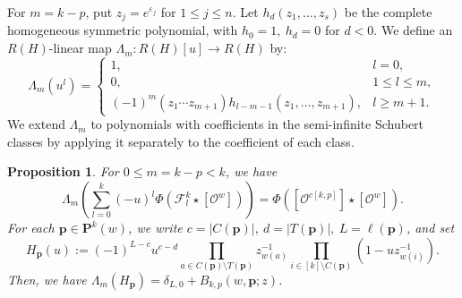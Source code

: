 \documentclass[11pt,a4paper,reqno]{amsart}
\DeclareRobustCommand{\rev}[1]{{\color{revision}#1}}
\numberwithin{equation}{section}
\newtheorem{proposition}[theorem]{Proposition}
\theoremstyle{definition}
\newcommand{\OO}{\mathcal O}
\newcommand{\Sc}[1]{[\OO^{#1}]}
\newcommand{\Pieri}{\mathbf P}
\newcommand{\pp}{\mathbf p}
\newcommand{\eps}{\varepsilon}
\newcommand{\FF}{\mathcal F}
\newcommand{\ck}{c[k,p]}
\begin{document}
For \(m=k-p\), put \(z_j=e^{\eps_j}\) for \(1 \le j \le n\). Let \(h_d(z_1,\ldots,z_s)\) be the complete homogeneous symmetric polynomial, with \(h_0=1,\ h_d=0\) for \(d<0\). We define an \(R(H)\)-linear map \(\Lambda_m:R(H)[u]\longrightarrow R(H)\) by:
\begin{equation}\label{eq:lambda}
 \Lambda_m(u^l)=
 \begin{cases}
 1,&l=0,\\
 0,&1\le l\le m,\\
 (-1)^m(z_1\cdots z_{m+1})h_{l-m-1}(z_1,\ldots,z_{m+1}),&l\ge m+1 .
 \end{cases}
\end{equation}
\rev{We extend \(\Lambda_m\) to polynomials with coefficients in the semi-infinite Schubert classes by applying it separately to the coefficient of each class.}
\begin{proposition}\label{prop:dem}
For \(0\le m=k-p<k\), we have
\begin{equation}\label{eq:linear}
 \Lambda_m\left(\sum_{l=0}^k(-u)^l\Phi(\FF^k_l\star\Sc{w})\right)
   =\Phi(\Sc{\ck}\star\Sc{w}).
\end{equation}
For each \(\pp\in\Pieri^k(w)\), we write \(c=|C(\pp)|,\ d=|T(\pp)|,\ L=\ell(\pp)\), and set 
\begin{equation}\label{eq:pathpoly}
 H_{\pp}(u):=(-1)^{L-c}u^{c-d}
   \prod_{a\in C(\pp)\setminus T(\pp)}z_{w(a)}^{-1}
   \prod_{i\in[k]\setminus C(\pp)}(1-u z_{w(i)}^{-1}).
\end{equation}
Then, we have \(\Lambda_m(H_{\pp})=\delta_{L,0}+B_{k,p}(w,\pp;z)\).
\end{proposition}
\end{document}
